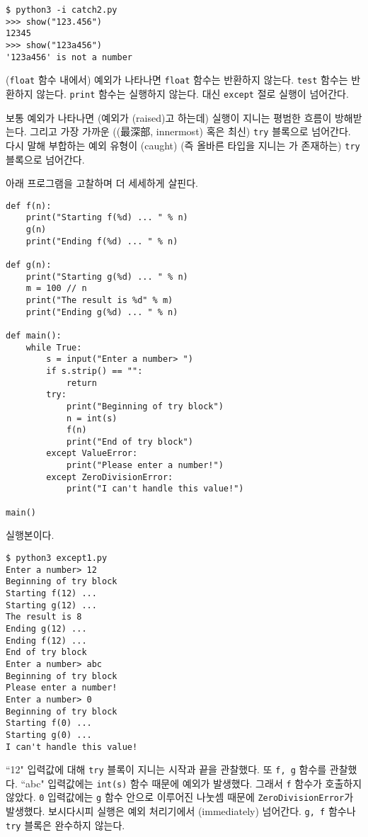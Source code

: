 \documentclass[a4paper]{oblivoir}
\begin{document}
\begin{lstlisting}
$ python3 -i catch2.py
>>> show("123.456")
12345
>>> show("123a456")
'123a456' is not a number
\end{lstlisting}

(\texttt{float} 함수 내에서) 예외가 나타나면 \texttt{float} 함수는 반환하지 않는다. \texttt{test} 함수는 반환하지 않는다. \texttt{print} 함수는 실행하지 않는다. 대신 \texttt{except} 절로 실행이 넘어간다. 

보통 예외가 나타나면 (예외가 (raised)고 하는데) 실행이 지니는 평범한 흐름이 방해받는다. 그리고 가장 가까운 ((最深部, innermost) 혹은 최신) \texttt{try} 블록으로 넘어간다. 다시 말해 부합하는 예외 유형이 (caught) (즉 올바른 타입을 지니는 가 존재하는) \texttt{try} 블록으로 넘어간다. 

아래 프로그램을 고찰하며 더 세세하게 살핀다.

\begin{verbatim}
def f(n):
    print("Starting f(%d) ... " % n)
    g(n)
    print("Ending f(%d) ... " % n)
    
def g(n):
    print("Starting g(%d) ... " % n)
    m = 100 // n
    print("The result is %d" % m)
    print("Ending g(%d) ... " % n)
    
def main():
    while True:
        s = input("Enter a number> ")
        if s.strip() == "":
            return
        try:
            print("Beginning of try block")
            n = int(s)
            f(n)
            print("End of try block")
        except ValueError:
            print("Please enter a number!")
        except ZeroDivisionError:
            print("I can't handle this value!")

main()
\end{verbatim}

실행본이다.

\begin{lstlisting}
$ python3 except1.py
Enter a number> 12
Beginning of try block
Starting f(12) ...
Starting g(12) ...
The result is 8
Ending g(12) ...
Ending f(12) ...
End of try block
Enter a number> abc
Beginning of try block
Please enter a number!
Enter a number> 0
Beginning of try block
Starting f(0) ...
Starting g(0) ...
I can't handle this value!
\end{lstlisting}

\noindent``12" 입력값에 대해 \texttt{try} 블록이 지니는 시작과 끝을 관찰했다. 또 \texttt{f, g} 함수를 관찰했다. ``abc" 입력값에는 \texttt{int(s)} 함수 때문에 예외가 발생했다. 그래서 \texttt{f} 함수가 호출하지 않았다. \texttt{0} 입력값에는 \texttt{g} 함수 안으로 이루어진 나눗셈 때문에 \texttt{ZeroDivisionError}가 발생했다. 보시다시피 실행은 예외 처리기에서 (immediately) 넘어간다. \texttt{g, f} 함수나 \texttt{try} 블록은 완수하지 않는다.
\end{document}
